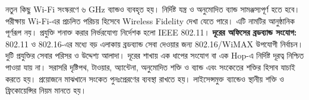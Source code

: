 নতুন কিছু Wi-Fi সংস্করণে ৬ GHz ব্যান্ডও ব্যবহৃত হয়। নির্দিষ্ট যন্ত্র ও অনুমোদিত ব্যান্ড সামঞ্জস্যপূর্ণ হতে হবে। পরীক্ষায় Wi-Fi-এর প্রচলিত পরিচয় হিসেবে Wireless Fidelity দেখা যেতে পারে। এটি নামটির আনুষ্ঠানিক পূর্ণরূপ নয়। প্রযুক্তি শনাক্ত করার নির্ভরযোগ্য নির্দেশক হলো IEEE 802.11।
\textbf{দূরের অফিসের ব্রডব্যান্ড সংযোগ:} 802.11 ও 802.16-এর মধ্যে বড় এলাকায় ব্রডব্যান্ড সেবা দেওয়ার জন্য 802.16/WiMAX উপযোগী নির্বাচন। দুটি প্রযুক্তির সেবার পরিসর ও উদ্দেশ্য আলাদা। দূরের শাখায় এক ধাপের সংযোগ বা এক Hop-এ নির্দিষ্ট দূরত্ব নিশ্চিত পাওয়া যায় না। সরাসরি দৃষ্টিপথ, টাওয়ার, অ্যান্টেনা, অনুমোদিত শক্তি ও ব্যান্ড এবং সংকেতের শক্তির হিসাব যাচাই করতে হয়। প্রয়োজনে মাঝখানে সংকেত পুনঃপ্রেরণের ব্যবস্থা রাখতে হয়। লাইসেন্সমুক্ত ব্যান্ডেও স্থানীয় শক্তি ও ফ্রিকোয়েন্সির নিয়ম মানতে হয়।

